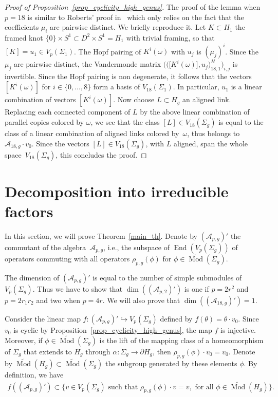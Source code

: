 \documentclass[11pt]{article}
\newcommand{\End}{\operatorname{End}}
\newcommand{\Mod}{\operatorname{Mod}}
\newcommand{\emcg}{\widetilde{\Mod}(\Sigma_g)}
\newcommand{\eemcg}{\widetilde{\Mod}(H_g)}
\numberwithin{equation}{section}
\begin{document}
\begin{proof}[Proof of Proposition~\ref{prop_cyclicity_high_genus}]
The proof of the lemma when $p=18$ is similar to Roberts' proof in~\cite{Ro} which only relies on the fact that the coefficients $\mu_i$ are pairwise distinct. We briefly reproduce it. Let $K\subset H_1$ the framed knot $\{0\}\times S^1 \subset D^2\times S^1=H_1$ with trivial framing, so that $[K]=u_1\in V_p(\Sigma_1)$. The Hopf pairing of $K^i(\omega)$ with $u_j$ is $(\mu_j)^i$. Since the $\mu_j$ are pairwise distinct, the Vandermonde matrix $\big(\big( \big[K^i(\omega)\big], u_j \big)_{18, 1}^H\big)_{i,j}$ is invertible. Since the Hopf pairing is non degenerate, it follows that the vectors $[K^i (\omega)]$ for $i\in \{0, \ldots, 8 \}$ form a basis of $V_{18}(\Sigma_1)$. In particular, $u_1$ is a linear combination of vectors $[K^i(\omega)]$. Now choose $L\subset H_g$ an aligned link. Replacing each connected component of $L$ by the above linear combination of parallel copies colored by $\omega$, we see that the class $[L]\in V_{18}(\Sigma_g)$ is equal to the class of a linear combination of aligned links colored by~$\omega$, thus belongs to $\mathcal{A}_{18,g}\cdot v_0$. Since the vectors $[L]\in V_{18}(\Sigma_g)$, with $L$ aligned, span the whole space~$V_{18}(\Sigma_g)$, this concludes the proof.
\end{proof}

\section{Decomposition into irreducible factors}

 In this section, we will prove Theorem~\ref{main_th}. Denote by $(\mathcal{A}_{p,g})'$ the commutant of the algebra~$\mathcal{A}_{p,g}$, i.e., the subspace of $\End(V_p(\Sigma_g))$ of operators commuting with all operators $\rho_{p,g}(\phi)$ for $\phi\in \emcg$.

The dimension of $(\mathcal{A}_{p,g})'$ is equal to the number of simple submodules of $V_p(\Sigma_g)$. Thus we have to show that $\dim( (\mathcal{A}_{p,2})')$ is one if $p=2r^2$ and $p=2r_1r_2$ and two when $p=4r$. We will also prove that $\dim( (\mathcal{A}_{18,g})')=1$.

Consider the linear map $f\colon (\mathcal{A}_{p,g})' \hookrightarrow V_p(\Sigma_g)$ defined by $f(\theta)= \theta\cdot v_0$. Since $v_0$ is cyclic by Proposition~\ref{prop_cyclicity_high_genus}, the map $f$ is injective. Moreover, if $\phi \in \emcg$ is the lift of the mapping class of a homeomorphism of $\Sigma_g$ that extends to $H_g$ through $\alpha \colon \Sigma_g \rightarrow \partial H_g$, then $ \rho_{p,g}(\phi)\cdot v_0 = v_0$. Denote by $\eemcg\subset \emcg$ the subgroup generated by these elements $\phi$. By definition, we have
\begin{gather*} f ( (\mathcal{A}_{p,g})' ) \subset \big\{ v\in V_p(\Sigma_g) \mbox{ such that } \rho_{p,g}(\phi)\cdot v = v, \mbox{ for all }\phi\in \eemcg \big\}.\end{gather*}
\end{document}
